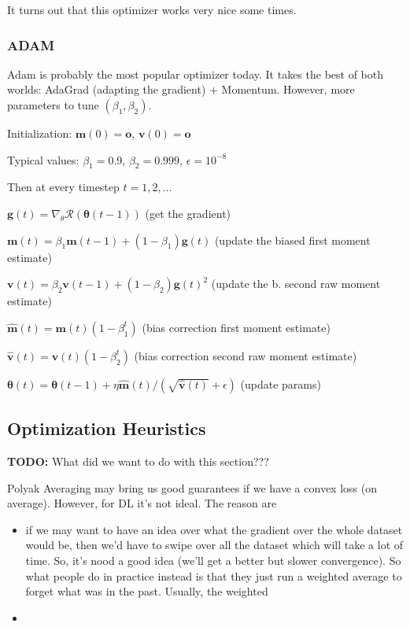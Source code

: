 \documentclass[a2paper,8pt]{extarticle}
\newcommand{\cR}{\mathcal{R}}
\renewcommand{\vec}[1]{\mathbf{#1}}
\newcommand{\vg}{\vec{g}}
\newcommand{\vm}{\vec{m}}
\newcommand{\vo}{\vec{o}}
\newcommand{\vv}{\vec{v}}
\newcommand{\vtheta}{\boldsymbol{\theta}}
\newcommand{\todo}[1]{\textbf{TODO:} #1}
\newcommand{\todo}[1]{%
}
\begin{document}
\begin{landscape}
\begin{multicols*}{7}
It turns out that this optimizer works very nice some times.

\subsubsection{ADAM}

Adam is probably the most popular optimizer today. It takes the best of both
worlds: AdaGrad (adapting the gradient) + Momentum. However, more parameters to
tune $(\beta_1,\beta_2)$.

Initialization: $\vm(0)=\vo$, $\vv(0)=\vo$

Typical values: $\beta_1=0.9$, $\beta_2=0.999$, $\epsilon=10^{-8}$

Then at every timestep $t=1,2,\ldots$

$\vg(t)=\nabla_{\theta}\cR(\vtheta(t-1))$ (get the gradient)

$\vm(t)=\beta_1 \vm(t-1)+(1-\beta_1)\vg(t)$ (update the biased first moment
estimate)

$\vv(t)=\beta_2 \vv(t-1)+(1-\beta_2)\vg(t)^2$ (update the b. second raw moment
estimate)

$\hat{\vm}(t)=\vm(t)(1-\beta_1^t)$ (bias correction first moment estimate)

$\hat{\vv}(t)=\vv(t)(1-\beta_2^t)$ (bias correction second raw moment estimate)

$\vtheta(t)=\vtheta(t-1)+\eta\hat{\vm}(t)/(\sqrt{\hat{\vv}(t)}+\epsilon)$
(update params)

\subsection{Optimization Heuristics}

\todo{What did we want to do with this section???}

Polyak Averaging may bring us good guarantees if we have a convex loss (on
average). However, for DL it's not ideal. The reason are
\begin{itemize}
  \item if we may want to have an idea over what the gradient over the whole
  dataset would be, then we'd have to swipe over all the dataset which will take
  a lot of time. So, it's nood a good idea (we'll get a better but slower
  convergence). So what people do in practice instead is that they just run a
  weighted average to forget what was in the past. Usually, the weighted  
  \item 
\end{itemize} 


\end{multicols*}
\end{landscape}
\end{document}
